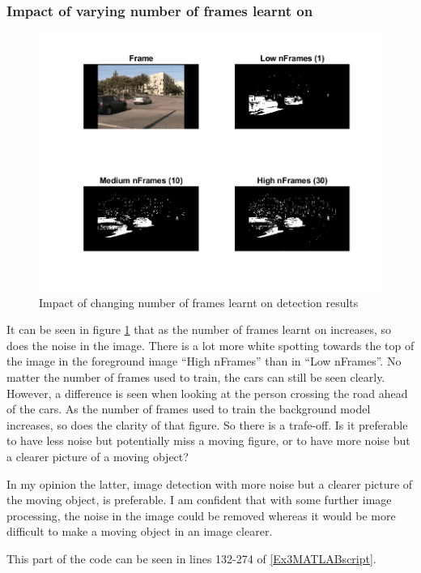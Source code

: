 \documentclass[11pt, letterpaper]{article}
\begin{document}
\subsubsection*{Impact of varying number of frames learnt on}
\begin{figure}[ht]
    \centering
    \includegraphics[width=0.75\linewidth]{Lab 3/CompareNFrames.png}
    \caption{Impact of changing number of frames learnt on detection results}
    \label{fig:CompareNFrames}
\end{figure}
It can be seen in figure \ref{fig:CompareNFrames} that as the number of frames learnt on increases, so does the noise in the image. There is a lot more white spotting towards the top of the image in the foreground image ``High nFrames'' than in ``Low nFrames''. No matter the number of frames used to train, the cars can still be seen clearly. However, a difference is seen when looking at the person crossing the road ahead of the cars. As the number of frames used to train the background model increases, so does the clarity of that figure. So there is a trafe-off. Is it preferable to have less noise but potentially miss a moving figure, or to have more noise but a clearer picture of a moving object?

In my opinion the latter, image detection with more noise but a clearer picture of the moving object, is preferable. I am confident that with some further image processing, the noise in the image could be removed whereas it would be more difficult to make a moving object in an image clearer.

This part of the code can be seen in lines 132-274 of \ref{Ex3MATLABscript}.

\pagebreak
\end{document}
